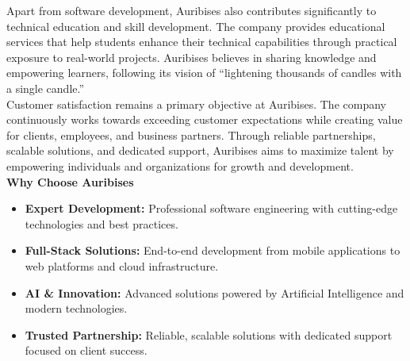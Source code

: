 \documentclass[12pt, oneside]{article}
\begin{document}
Apart from software development, Auribises also contributes significantly to technical education and skill development. The company provides educational services that help students enhance their technical capabilities through practical exposure to real-world projects. Auribises believes in sharing knowledge and empowering learners, following its vision of “lightening thousands of candles with a single candle.”\\[0.25cm]
Customer satisfaction remains a primary objective at Auribises. The company continuously works towards exceeding customer expectations while creating value for clients, employees, and business partners. Through reliable partnerships, scalable solutions, and dedicated support, Auribises aims to maximize talent by empowering individuals and organizations for growth and development.\\[0.25cm]
\textbf{Why Choose Auribises}
\begin{itemize}
    \item \textbf{Expert Development:} Professional software engineering with cutting-edge technologies and best practices.
    
    \item \textbf{Full-Stack Solutions:} End-to-end development from mobile applications to web platforms and cloud infrastructure.
    
    \item \textbf{AI \& Innovation:} Advanced solutions powered by Artificial Intelligence and modern technologies.
    
    \item \textbf{Trusted Partnership:} Reliable, scalable solutions with dedicated support focused on client success.
\end{itemize}
\end{document}
